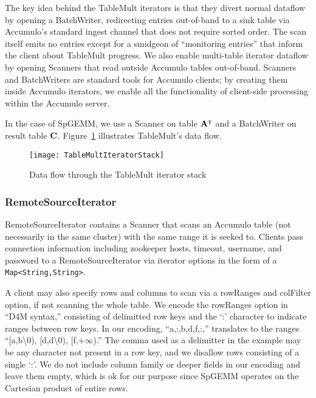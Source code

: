 The key idea behind the TableMult iterators is that they divert normal dataflow by opening a BatchWriter,
redirecting entries out-of-band to a sink table via %
Accumulo's standard ingest channel that does not require sorted order. 
The scan itself emits no entries except for a smidgeon of ``monitoring entries'' 
that inform the client about TableMult progress.
We also enable multi-table iterator dataflow by opening Scanners 
that read outside Accumulo tables out-of-band.
Scanners and BatchWriters are standard tools for Accumulo clients; 
by creating them inside Accumulo iterators, we enable all the functionality of client-side processing 
within the Accumulo server.

In the case of SpGEMM, we use a Scanner on table $\mathbf{A^{\intercal}}$
and a BatchWriter on result table $\mathbf{C}$.
Figure~\ref{fIteratorStackSpGEMM} illustrates TableMult's data flow.

\begin{figure}[htb]
\centering
\texttt{[image: TableMultIteratorStack]}
\caption{Data flow through the TableMult iterator stack}
\label{fIteratorStackSpGEMM}
\end{figure}

\subsubsection{RemoteSourceIterator}
RemoteSourceIterator contains a Scanner that scans an Accumulo table
(not necessarily in the same cluster) with the same range it is seeked to.
Clients pass connection information including zookeeper hosts, timeout,
username, and password to a RemoteSourceIterator via iterator options
in the form of a \texttt{Map<String,String>}.

A client may also specify rows and columns to scan via a rowRanges and colFilter option, 
if not scanning the whole table. We encode the rowRanges option in ``D4M syntax,'' consisting of 
delimitted row keys and the `:' character to indicate ranges between row keys.
In our encoding, ``a,:,b,d,f,:,'' translates to the ranges 
``[a,b\textbackslash{}0), [d,d\textbackslash{}0), [f,$+\infty$).'' The comma used as a delimitter in the example 
may be any character not present in a row key, and we disallow rows consisting of a single `:'.
We do not include column family or deeper fields in our encoding and leave them empty, 
which is ok for our purpose since SpGEMM operates on the Cartesian product of entire rows.

